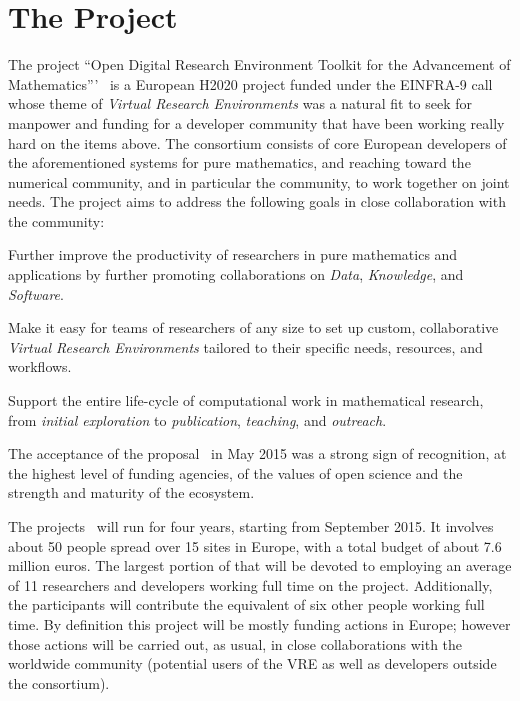 \section{The \ODK Project}\label{sec:odk}
The project ``Open Digital Research Environment Toolkit for the Advancement of
Mathematics'''~\cite{OpenDreamKit:on} is a European H2020 project funded under the
EINFRA-9 call~\cite{EINFRA-9} whose theme of \emph{Virtual Research Environments} was a
natural fit to seek for manpower and funding for a developer community that have been
working really hard on the items above. The \ODK consortium consists of core European
developers of the aforementioned systems for pure mathematics, and reaching toward the
numerical community, and in particular the \Jupyter community, to work together on joint
needs. The project aims to address the following goals in close collaboration with the
community:
\begin{compactenum}
\item Further improve the productivity of researchers in pure mathematics and applications
  by further promoting collaborations on \emph{Data}, \emph{Knowledge}, and
  \emph{Software}.
\item Make it easy for teams of researchers of any size to set up custom, collaborative
  \emph{Virtual Research Environments} tailored to their specific needs, resources, and
  workflows.
\item Support the entire life-cycle of computational work in mathematical research, from
  \emph{initial exploration} to \emph{publication}, \emph{teaching}, and \emph{outreach}.
\end{compactenum}
The acceptance of the proposal~\cite{ODKproposal:on} in May 2015 was a strong sign of
recognition, at the highest level of funding agencies, of the values of open science and
the strength and maturity of the ecosystem.

The \ODK projects~\cite{ODKproposal:on} will run for four years, starting from September
2015. It involves about 50 people spread over 15 sites in Europe, with a total budget of
about 7.6 million euros. The largest portion of that will be devoted to employing an
average of 11 researchers and developers working full time on the project. Additionally,
the participants will contribute the equivalent of six other people working full time.  By
definition this project will be mostly funding actions in Europe; however those actions
will be carried out, as usual, in close collaborations with the worldwide community
(potential users of the VRE as well as developers outside the \ODK consortium).


